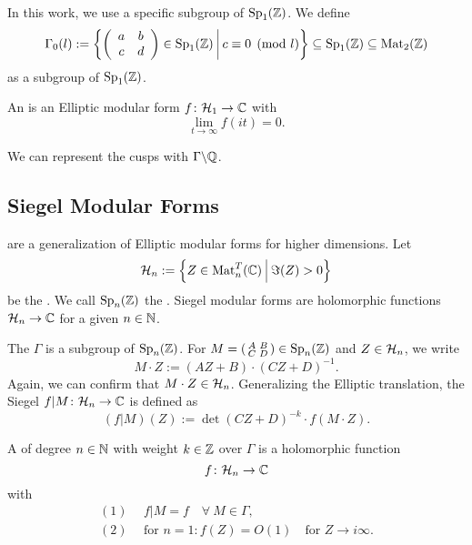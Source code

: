In this work, we use a specific subgroup of $\operatorname{Sp}_1(\mathbb{Z})$. We define
\[ \Gamma_0(l) := \Set{\SimpleMatrix{a}{b}{c}{d} \in \Sp_1(\Z)}{c \equiv 0 \pmod{l}} \subseteq \Sp_1(\Z) \subseteq \M_2(\Z) \]
as a subgroup of $\operatorname{Sp}_1(\mathbb{Z})$.

An  is an Elliptic modular form $f \colon \mathcal{H}_1 \rightarrow \mathbb{C}$ with
\[ \lim_{t \rightarrow \infty} f(i t) = 0 . \]

We can represent the cusps with $\Gamma \backslash \mathbb{Q}$.



\subsection{Siegel Modular Forms}

 are a generalization of Elliptic modular forms for higher dimensions.
Let
\[ \SiegelHalfPlane_n := \Set{Z \in \M_n^T(\C)}{\Im(Z) > 0} \]
be the .
We call $\operatorname{Sp}_n(\mathbb{Z})$ the .
Siegel modular forms are holomorphic functions $\mathcal{H}_n \rightarrow \mathbb{C}$ for a given  $n \in \mathbb{N}$.

The  $\Gamma$ is a subgroup of $\operatorname{Sp}_n(\mathbb{Z})$. For $M = \left( \begin{smallmatrix} A & B \\ C & D \end{smallmatrix} \right) \in \operatorname{Sp}_n(\mathbb{Z})$ and $Z \in \mathcal{H}_n$, we write
\[ M \cdot Z := (A Z + B) \cdot (C Z + D)^{-1} . \]
Again, we can confirm that $M\cdot Z \in \mathcal{H}_n$.
Generalizing the Elliptic translation, the Siegel  $f | M \colon \mathcal{H}_n \rightarrow \mathbb{C}$ is defined as   
\[ ( f | M ) (Z) :=
\det(CZ + D)^{-k} \cdot f(M \cdot Z) . \]



A  of degree $n\in\mathbb{N}$ with weight $k \in \mathbb{Z}$ over $\Gamma$ is a holomorphic function
\[ f \colon \mathcal{H}_n \rightarrow \mathbb{C} \]
with
\begin{align*}
(1) \ \ & f|M = f \quad \forall \ M \in \Gamma, \\
(2) \ \ & \text{for } n = 1 \colon f(Z) = O(1) \quad \text{for } Z \rightarrow i \infty .
\end{align*}

